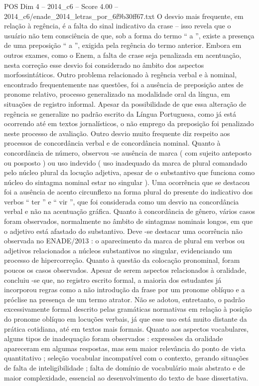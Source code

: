\begin{textsample}{POS Dim 4 – 2014\_c6 – Score 4.00 – 2014\_c6/enade\_2014\_letras\_por\_6f9b30ff67.txt}
O desvio mais frequente, em relação à regência, é a falta do sinal indicativo da crase – isso revela que o usuário não tem consciência de que, sob a forma do termo “ a ”, existe a presença de uma preposição “ a ”, exigida pela regência do termo anterior.
Embora em outros exames, como o Enem, a falta de crase seja penalizada em acentuação, nesta correção esse desvio foi considerado no âmbito dos aspectos morfossintáticos.
Outro problema relacionado à regência verbal e à nominal, encontrado frequentemente nas questões, foi a ausência de preposição antes de pronome relativo, processo generalizado na modalidade oral da língua, em situações de registro informal.
Apesar da possibilidade de que essa alteração de regência se generalize no padrão escrito da Língua Portuguesa, como já está ocorrendo até em textos jornalísticos, o não emprego da preposição foi penalizado neste processo de avaliação.
Outro desvio muito frequente diz respeito aos processos de concordância verbal e de concordância nominal.
Quanto à concordância de número, observou -se ausência de marca ( com sujeito anteposto ou posposto ) ou uso indevido ( uso inadequado da marca de plural comandado pelo núcleo plural da locução adjetiva, apesar de o substantivo que funciona como núcleo do sintagma nominal estar no singular ).
Uma ocorrência que se destacou foi a ausência de acento circunflexo na forma plural do presente do indicativo dos verbos “ ter ” e “ vir ”, que foi considerada como um desvio na concordância verbal e não na acentuação gráfica.
Quanto à concordância de gênero, vários casos foram observados, normalmente no âmbito de sintagmas nominais longos, em que o adjetivo está afastado do substantivo.
Deve -se destacar uma ocorrência não observada no ENADE/2013 : o aparecimento da marca de plural em verbos ou adjetivos relacionados a núcleos substantivos no singular, evidenciando um processo de hipercorreção.
Quanto à questão da colocação pronominal, foram poucos os casos observados.
Apesar de serem aspectos relacionados à oralidade, concluiu -se que, no registro escrito formal, a maioria dos estudantes já incorporou regras como a não introdução da frase por um pronome oblíquo e a próclise na presença de um termo atrator.
Não se adotou, entretanto, o padrão excessivamente formal descrito pelas gramáticas normativas em relação à posição do pronome oblíquo em locuções verbais, já que esse uso está muito distante da prática cotidiana, até em textos mais formais.
Quanto aos aspectos vocabulares, alguns tipos de inadequação foram observados : expressões da oralidade apareceram em algumas respostas, mas sem maior relevância do ponto de vista quantitativo ; seleção vocabular incompatível com o contexto, gerando situações de falta de inteligibilidade ; falta de domínio de vocabulário mais abstrato e de maior complexidade, essencial ao desenvolvimento do texto de base dissertativa.

\end{textsample}
